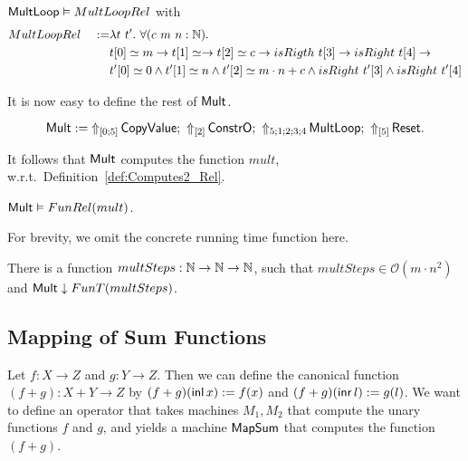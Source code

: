 \begin{lemma}
  \label{lem:Mult_Loop_Realise}
  $\MS{MultLoop} \Realise MultLoopRel$ with
  \begin{alignat*}{2}
    & MultLoopRel ~&:=& \lambda t~t'.~\forall (c~m~n:\Nat). \\
    &&& t[0] \simeq m \rightarrow t[1] \simeq \rightarrow t[2] \simeq c \rightarrow isRigth~t[3] \rightarrow isRight~t[4] \rightarrow \\
    &&& t'[0] \simeq 0 \land t'[1] \simeq n \land t'[2] \simeq m \cdot n + c \land isRight~t'[3] \land isRight~t'[4]
  \end{alignat*}
\end{lemma}

It is now easy to define the rest of $\MS{Mult}$.
\begin{definition}[$\MS{Mult}$][Mult]
  \label{def:Mult}
  \[
    \MS{Mult} :=
    \LiftTapes{\MS{CopyValue}}{\Vector{0;5}} \Seq
    \LiftTapes{\MS{ConstrO}}{\Vector{2}} \Seq
    \LiftTapes{\MS{MultLoop}}{5;1;2;3;4} \Seq
    \LiftTapes{\MS{Reset}}{\Vector{5}}.
  \]
\end{definition}

It follows that $\MS{Mult}$ computes the function $mult$, w.r.t.\ Definition~\ref{def:Computes2_Rel}.
\begin{lemma}
  \label{lem:Mult_Computes}
  $\MS{Mult} \Realise FunRel(mult)$.
\end{lemma}

For brevity,  we omit the concrete running time function here.  
\begin{lemma}
  There is a function $multSteps : \Nat\to\Nat\to\Nat$, such that $multSteps \in \mathcal{O}(m \cdot n^2)$ and
  $\MS{Mult} \TerminatesIn FunT(multSteps)$.
\end{lemma}

\subsection{Mapping of Sum Functions}
\label{sec:SumTM}
%

Let $f : X \to Z$ and $g : Y \to Z$.  Then we can define the canonical function $(f+g) : X+Y \to Z$ by $(f+g)(\inl x):=f(x)$ and
$(f+g)(\inr l):=g(l)$.  We want to define an operator that takes machines $M_1, M_2$ that compute the unary functions $f$ and $g$, and yields a
machine $\MS{MapSum}$ that computes the function $(f+g)$.

